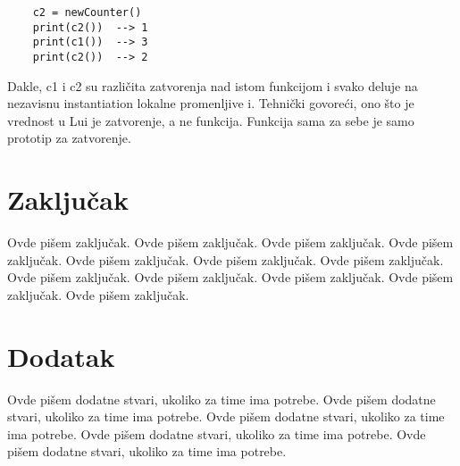 \documentclass[a4paper]{article}
\begin{document}
\begin{verbatim}
    c2 = newCounter()
    print(c2())  --> 1
    print(c1())  --> 3
    print(c2())  --> 2
\end{verbatim}
Dakle, c1 i c2 su različita zatvorenja nad istom funkcijom i svako deluje na nezavisnu instantiation lokalne promenljive i. Tehnički govoreći, ono što je vrednost u Lui je zatvorenje, a ne funkcija. Funkcija sama za sebe je samo prototip za zatvorenje.

\section{Zaključak}
\label{sec:zakljucak}

Ovde pišem zaključak. 
Ovde pišem zaključak. 
Ovde pišem zaključak. 
Ovde pišem zaključak. 
Ovde pišem zaključak. 
Ovde pišem zaključak. 
Ovde pišem zaključak. 
Ovde pišem zaključak. 
Ovde pišem zaključak. 
Ovde pišem zaključak. 
Ovde pišem zaključak. 
Ovde pišem zaključak. 


\appendix
 


\appendix
\section{Dodatak}
Ovde pišem dodatne stvari, ukoliko za time ima potrebe.
Ovde pišem dodatne stvari, ukoliko za time ima potrebe.
Ovde pišem dodatne stvari, ukoliko za time ima potrebe.
Ovde pišem dodatne stvari, ukoliko za time ima potrebe.
Ovde pišem dodatne stvari, ukoliko za time ima potrebe.
\end{document}
